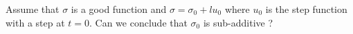 \begin{problem}
Assume that $\sigma$ is a good function and $\sigma= \sigma_0 + l
u_0$ where $u_0$ is the step function with a step at $t=0$. Can we
conclude that $\sigma_0$ is sub-additive ? 
\end{problem}
